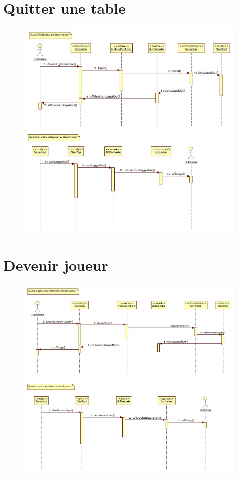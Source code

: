 \section{Quitter une table}
\begin{figure}[ht]
	\centering \includegraphics[angle=90, width=\linewidth]{figures/DetailedDeconnexionSequenceDiagram.jpg}
\end{figure}
\clearpage
\section{Devenir joueur}
\begin{figure}[ht]
	\centering \includegraphics[angle=90, width=\linewidth]{figures/DetailedBecomingPlayerSequenceDiagram.jpg}
\end{figure}
\clearpage

